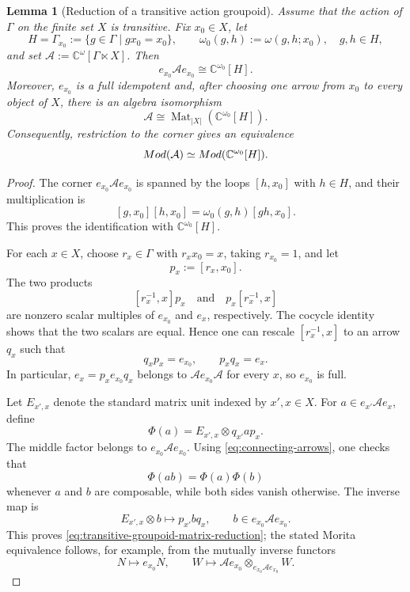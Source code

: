 \documentclass[10pt,a4paper]{amsart}
\newtheorem{lemma}{Lemma}
\begin{document}
\begin{lemma}[Reduction of a transitive action groupoid]
\label{lem:transitive-groupoid-reduction}
Assume that the action of $\Gamma$ on the finite set $X$ is transitive.  Fix
$x_0\in X$, let
\[
 H=\Gamma_{x_0}:=\{g\in\Gamma\mid gx_0=x_0\},
 \qquad
 \omega_0(g,h):=\omega(g,h;x_0),\quad g,h\in H,
\]
and set $\mathcal A:=\mathbb C^{\omega}[\Gamma\ltimes X]$.  Then
\[
 e_{x_0}\mathcal A e_{x_0}\cong\mathbb C^{\omega_0}[H].
\]
Moreover, $e_{x_0}$ is a full idempotent and, after choosing one arrow from
$x_0$ to every object of $X$, there is an algebra isomorphism
\begin{equation}\label{eq:transitive-groupoid-matrix-reduction}
 \mathcal A
 \cong
 \operatorname{Mat}_{|X|}\!\left(\mathbb C^{\omega_0}[H]\right).
\end{equation}
Consequently, restriction to the corner gives an equivalence
\[
 {\rm Mod}(\mathcal A)
 \simeq
 {\rm Mod}(\mathbb C^{\omega_0}[H]).
\]
\end{lemma}

\begin{proof}
The corner $e_{x_0}\mathcal A e_{x_0}$ is spanned by the loops $[h,x_0]$ with
$h\in H$, and their multiplication is
\[
 [g,x_0][h,x_0]=\omega_0(g,h)[gh,x_0].
\]
This proves the identification with $\mathbb C^{\omega_0}[H]$.

For each $x\in X$, choose $r_x\in\Gamma$ with $r_xx_0=x$, taking
$r_{x_0}=1$, and let
\[
 p_x:=[r_x,x_0].
\]
The two products
\[
 [r_x^{-1},x]p_x
 \quad\text{and}\quad
 p_x[r_x^{-1},x]
\]
are nonzero scalar multiples of $e_{x_0}$ and $e_x$, respectively.  The cocycle
identity shows that the two scalars are equal.  Hence one can rescale
$[r_x^{-1},x]$ to an arrow $q_x$ such that
\begin{equation}\label{eq:connecting-arrows}
 q_xp_x=e_{x_0},
 \qquad
 p_xq_x=e_x.
\end{equation}
In particular, $e_x=p_xe_{x_0}q_x$ belongs to
$\mathcal A e_{x_0}\mathcal A$ for every $x$, so $e_{x_0}$ is full.

Let $E_{x',x}$ denote the standard matrix unit indexed by $x',x\in X$.  For
$a\in e_{x'}\mathcal A e_x$, define
\begin{equation}\label{eq:explicit-groupoid-matrix-map}
 \Phi(a)=E_{x',x}\otimes q_{x'}ap_x.
\end{equation}
The middle factor belongs to $e_{x_0}\mathcal A e_{x_0}$.  Using
\eqref{eq:connecting-arrows}, one checks that
\[
 \Phi(ab)=\Phi(a)\Phi(b)
\]
whenever $a$ and $b$ are composable, while both sides vanish otherwise.  The
inverse map is
\[
 E_{x',x}\otimes b\longmapsto p_{x'}bq_x,
 \qquad
 b\in e_{x_0}\mathcal A e_{x_0}.
\]
This proves \eqref{eq:transitive-groupoid-matrix-reduction}; the stated Morita
equivalence follows, for example, from the mutually inverse functors
\[
 N\longmapsto e_{x_0}N,
 \qquad
 W\longmapsto \mathcal A e_{x_0}
       \otimes_{e_{x_0}\mathcal A e_{x_0}}W.
\]
\end{proof}
\end{document}
